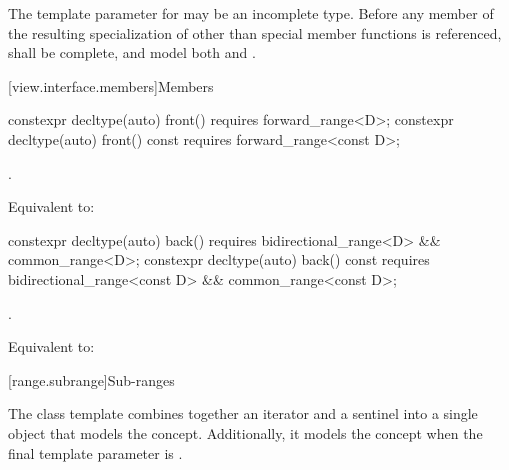 \pnum
The template parameter  for  may be an
incomplete type. Before any member of the resulting specialization of
 other than special member functions
is referenced,  shall be complete, and
model both  and .

[view.interface.members]{Members}

%
\begin{itemdecl}
constexpr decltype(auto) front() requires forward_range<D>;
constexpr decltype(auto) front() const requires forward_range<const D>;
\end{itemdecl}

\begin{itemdescr}
\pnum
\expects
{}.

\pnum
\effects
Equivalent to: 
\end{itemdescr}

%
\begin{itemdecl}
constexpr decltype(auto) back() requires bidirectional_range<D> && common_range<D>;
constexpr decltype(auto) back() const
  requires bidirectional_range<const D> && common_range<const D>;
\end{itemdecl}

\begin{itemdescr}
\pnum
\expects
{}.

\pnum
\effects
Equivalent to: 
\end{itemdescr}

[range.subrange]{Sub-ranges}

\pnum
The  class template combines together an
iterator and a sentinel into a single object that models the
 concept. Additionally, it models the
 concept when the final template parameter is
.


